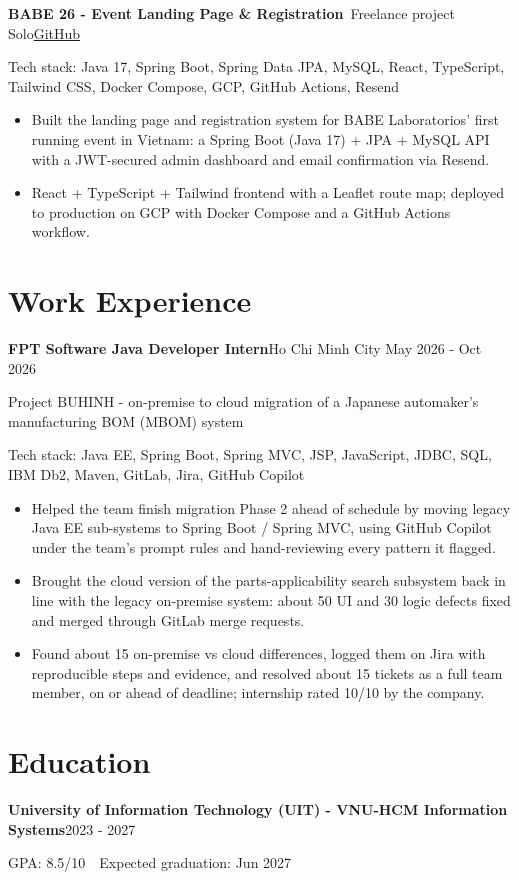 \documentclass[10pt, a4paper]{article}
\newcommand{\entry}[2]{\textbf{#1}\hfill#2\par}
\newcommand{\subentry}[2]{{\color{MutedText}#1}\hfill{\color{MutedText}#2}\par}
\newcommand{\project}[3]{\textbf{#1}\,{\color{MutedText}\textbar{} #2}\hfill\href{#3}{GitHub}\par}
\newcommand{\techstack}[1]{{\color{MutedText}Tech stack: #1}\par}
\begin{document}
\project{BABE 26 - Event Landing Page \& Registration}{Freelance project \textbullet{} Solo}{https://github.com/minhphuong150505/landing-page}
\techstack{Java 17, Spring Boot, Spring Data JPA, MySQL, React, TypeScript, Tailwind CSS, Docker Compose, GCP, GitHub Actions, Resend}
\begin{itemize}
  \item Built the landing page and registration system for BABE Laboratorios' first running event in Vietnam: a Spring Boot (Java 17) + JPA + MySQL API with a JWT-secured admin dashboard and email confirmation via Resend.
  \item React + TypeScript + Tailwind frontend with a Leaflet route map; deployed to production on GCP with Docker Compose and a GitHub Actions workflow.
\end{itemize}

\section{Work Experience}
\entry{FPT Software \textbar{} Java Developer Intern}{Ho Chi Minh City \textbar{} May 2026 - Oct 2026}
\subentry{Project BUHINH - on-premise to cloud migration of a Japanese automaker's manufacturing BOM (MBOM) system}{}
\techstack{Java EE, Spring Boot, Spring MVC, JSP, JavaScript, JDBC, SQL, IBM Db2, Maven, GitLab, Jira, GitHub Copilot}
\begin{itemize}
  \item Helped the team finish migration Phase 2 ahead of schedule by moving legacy Java EE sub-systems to Spring Boot / Spring MVC, using GitHub Copilot under the team's prompt rules and hand-reviewing every pattern it flagged.
  \item Brought the cloud version of the parts-applicability search subsystem back in line with the legacy on-premise system: about 50 UI and 30 logic defects fixed and merged through GitLab merge requests.
  \item Found about 15 on-premise vs cloud differences, logged them on Jira with reproducible steps and evidence, and resolved about 15 tickets as a full team member, on or ahead of deadline; internship rated 10/10 by the company.
\end{itemize}

\section{Education}
\entry{University of Information Technology (UIT) - VNU-HCM \textbar{} Information Systems}{2023 - 2027}
GPA: 8.5/10 \,\textbar\, Expected graduation: Jun 2027\par
\end{document}
